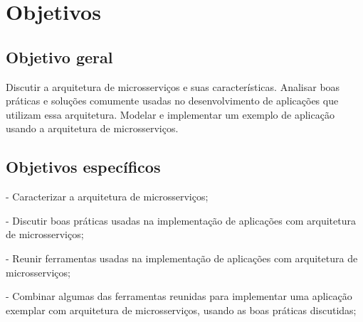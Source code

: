 
\section{Objetivos}\label{sec-objetivos}


\subsection{Objetivo geral}\label{sec-objetivo-geral}

Discutir a arquitetura de microsserviços e suas características. Analisar boas práticas e soluções comumente usadas no desenvolvimento de aplicações que utilizam essa arquitetura. Modelar e implementar um exemplo de aplicação usando a arquitetura de microsserviços.

\subsection{Objetivos específicos}\label{sec-objetivos-especificos}

- Caracterizar a arquitetura de microsserviços;

- Discutir boas práticas usadas na implementação de aplicações com arquitetura de microsserviços;

- Reunir ferramentas usadas na implementação de aplicações com arquitetura de microsserviços;


- Combinar algumas das ferramentas reunidas para implementar uma aplicação exemplar com arquitetura de microsserviços, usando as boas práticas discutidas;

